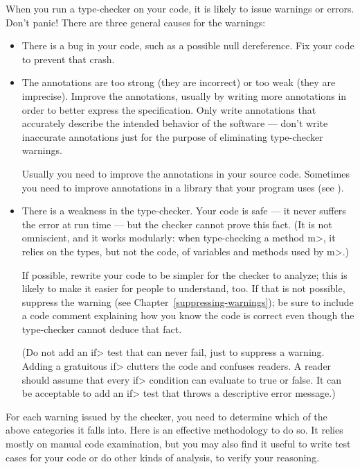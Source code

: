 When you run a type-checker on your code, it is likely to issue warnings or
errors.  Don't panic!  There are three general causes for the warnings:

\begin{itemize}
\item
  There is a bug in your code, such as a possible null dereference.  Fix
  your code to prevent that crash.

\item
  The annotations are too strong (they are incorrect) or too weak (they
  are imprecise).  Improve the
  annotations, usually by writing more annotations in order to better
  express the specification.
  Only write annotations that accurately describe the intended behavior of
  the software --- don't write inaccurate annotations just for the purpose
  of eliminating type-checker warnings.

  Usually you need to improve the annotations in your source code.
  Sometimes you need to improve annotations in a library that your program
  uses (see ).

\item
  There is a weakness in the type-checker.  Your code is safe --- it never
  suffers the error at run time --- but the checker cannot prove this fact.
  (It is not omniscient, and it works modularly:  when type-checking a
  method \<m>, it relies on the types, but not the code, of variables and
  methods used by \<m>.)

  If possible, rewrite your code to be simpler for the checker to analyze;
  this is likely to make it easier for people to understand, too.
  If that is not possible, suppress the warning (see
  Chapter~\ref{suppressing-warnings}); be sure to include a code
  comment explaining how you know the code is correct even though the
  type-checker cannot deduce that fact.

  (Do not add an \<if> test that can never fail, just to suppress a
  warning.  Adding a gratuitous \<if> clutters the code and confuses
  readers.  A reader should assume that every \<if> condition can evaluate to true
  or false.  It can be acceptable to add an \<if> test that throws a
  descriptive error message.)
\end{itemize}

For each warning issued by the checker, you need to determine which of the
above categories it falls into.  Here is an effective methodology to do so.
It relies mostly on manual code examination, but you may also find it
useful to write test cases for your code or do other kinds of analysis, to
verify your reasoning.

